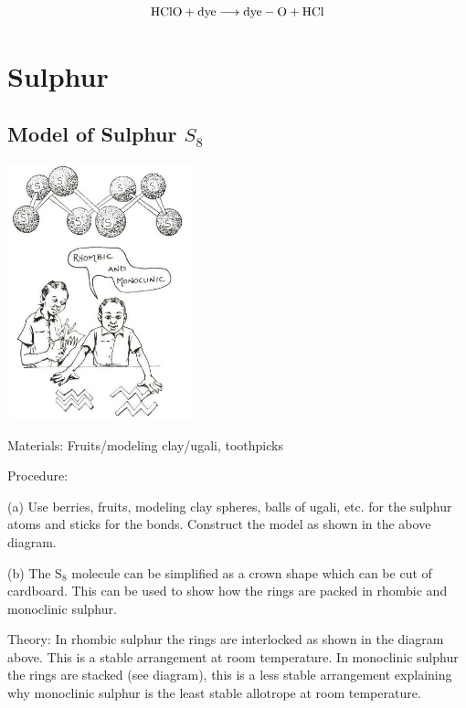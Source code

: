 \begin{multicols}{2}
\begin{description*}
{$$\ce{HClO} + \mathrm{dye} \longrightarrow \mathrm{dye-O} + \ce{HCl}$$}
\end{description*}


\section*{Sulphur} 


\subsection{Model of Sulphur $S_8$}

\begin{center}
\includegraphics[width=0.4\textwidth]{./img/source/sulphur-model.jpg}
\end{center}

\begin{description*}
\item[Materials:]{Fruits/modeling clay/ugali, toothpicks}
\item[Procedure:]{(a) Use berries, fruits, modeling
clay spheres, balls of ugali, etc. for the sulphur atoms and
sticks for the bonds. Construct the model as
shown in the above diagram.

(b) The S$_8$ molecule can be simplified as a
crown shape which can be cut of cardboard.
This can be used to show how the rings are
packed in rhombic and monoclinic sulphur.}
\item[Theory:]{In rhombic sulphur the rings are interlocked
as shown in the diagram above. This is a stable
arrangement at room temperature. In
monoclinic sulphur the rings are stacked (see
diagram), this is a less stable arrangement
explaining why monoclinic sulphur is the least
stable allotrope at room temperature.}
\end{description*}


\end{multicols}
